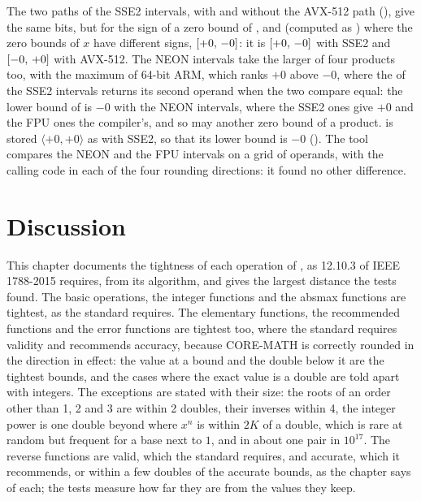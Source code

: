 \medskip
The two paths of the SSE2 intervals, with and without the AVX-512 path
(), give the same bits, but
for the sign of a zero bound of ,  and
 (computed as ) where the zero bounds of $x$ have
different signs, $[+0,\,-0]$: it is $[+0,\,-0]$ with SSE2 and
$[-0,\,+0]$ with AVX-512. The NEON intervals take the larger of four
products too,\newinvfive{} with the maximum of 64-bit ARM, which ranks
$+0$ above $-0$, where the  of the SSE2 intervals returns its
second operand when the two compare equal: the lower bound of
\code{[-1, 0] * [-1, 0]} is $-0$ with the NEON intervals, where the SSE2
ones give $+0$ and the FPU ones the compiler's, and so may another zero
bound of a product.  is stored
$\langle+0, +0\rangle$ as with SSE2, so that its lower bound is $-0$
(). The tool  compares the NEON
and the FPU intervals on a grid of operands, with the calling code in each
of the four rounding directions: it found no other difference.

\section{Discussion}

This chapter documents the tightness of each operation of ,
as 12.10.3 of IEEE 1788-2015 requires, from its algorithm, and gives the
largest distance the tests found. The basic operations, the integer
functions and the absmax functions are tightest, as the standard requires.
The elementary functions, the recommended functions and the error
functions are tightest too, where the standard requires validity and
recommends accuracy, because CORE-MATH is correctly rounded in the
direction in effect: the value at a bound and the double below it are the
tightest bounds, and the cases where the exact value is a double are told
apart with integers. The exceptions are stated with their size: the roots
of an order other than 1, 2 and 3 are within 2 doubles, their inverses
within 4, the integer power is one double beyond where $x^n$ is within $2K$ of a double, which is rare at random but frequent for a base next to $1$, and  in about one pair in $10^{17}$.
The reverse functions are valid, which the standard requires, and accurate,
which it recommends, or within a few doubles of the accurate bounds, as the
chapter says of each; the tests measure how far they are from the values they
keep.

